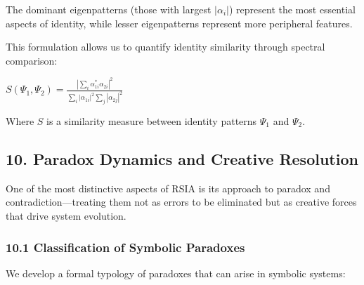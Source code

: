 \documentclass[12pt]{article}
\begin{document}
The dominant eigenpatterns (those with largest \(|\alpha_i|\)) represent
the most essential aspects of identity, while lesser eigenpatterns
represent more peripheral features.

This formulation allows us to quantify identity similarity through
spectral comparison:

\(S(\Psi_1, \Psi_2) = \frac{|\sum_i \alpha_{1i}^* \alpha_{2i}|^2}{\sum_i |\alpha_{1i}|^2 \sum_j |\alpha_{2j}|^2}\)

Where \(S\) is a similarity measure between identity patterns \(\Psi_1\)
and \(\Psi_2\).

\subsection{10. Paradox Dynamics and Creative
Resolution}\label{paradox-dynamics-and-creative-resolution}

One of the most distinctive aspects of RSIA is its approach to paradox
and contradiction---treating them not as errors to be eliminated but as
creative forces that drive system evolution.

\subsubsection{10.1 Classification of Symbolic
Paradoxes}\label{classification-of-symbolic-paradoxes}

We develop a formal typology of paradoxes that can arise in symbolic
systems:
\end{document}
